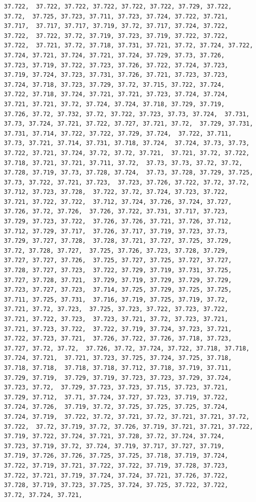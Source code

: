 \documentclass[
]{article}
\begin{document}
\begin{verbatim}
37.722,  37.722, 37.722, 37.722, 37.722, 37.722, 37.729, 37.722, 37.72,  37.725, 37.723, 37.711, 37.723, 37.724, 37.722, 37.721, 37.717,  37.717, 37.717, 37.719, 37.72, 37.717, 37.724, 37.722, 37.722,  37.722, 37.72, 37.719, 37.723, 37.719, 37.722, 37.722, 37.722,  37.721, 37.72, 37.718, 37.731, 37.721, 37.72, 37.724, 37.722,  37.724, 37.721, 37.724, 37.721, 37.724, 37.729, 37.73, 37.726,  37.723, 37.719, 37.722, 37.723, 37.726, 37.722, 37.724, 37.723,  37.719, 37.724, 37.723, 37.731, 37.726, 37.721, 37.723, 37.723,  37.724, 37.718, 37.723, 37.729, 37.72, 37.715, 37.722, 37.724,  37.722, 37.718, 37.724, 37.721, 37.721, 37.723, 37.724, 37.724,  37.721, 37.721, 37.72, 37.724, 37.724, 37.718, 37.729, 37.719,  37.726, 37.72, 37.732, 37.72, 37.722, 37.723, 37.73, 37.724,  37.731, 37.73, 37.724, 37.721, 37.722, 37.727, 37.721, 37.72,  37.729, 37.731, 37.731, 37.714, 37.722, 37.722, 37.729, 37.724,  37.722, 37.711, 37.73, 37.721, 37.714, 37.731, 37.718, 37.724,  37.724, 37.73, 37.73, 37.722, 37.721, 37.724, 37.72, 37.72, 37.721,  37.721, 37.72, 37.722, 37.718, 37.721, 37.721, 37.711, 37.72,  37.73, 37.73, 37.72, 37.72, 37.728, 37.719, 37.73, 37.728, 37.724,  37.73, 37.728, 37.729, 37.725, 37.73, 37.722, 37.721, 37.723,  37.723, 37.726, 37.722, 37.72, 37.72, 37.712, 37.723, 37.728,  37.722, 37.72, 37.724, 37.723, 37.722, 37.721, 37.722, 37.722,  37.712, 37.724, 37.726, 37.724, 37.727, 37.726, 37.72, 37.726,  37.726, 37.722, 37.731, 37.717, 37.723, 37.729, 37.723, 37.722,  37.726, 37.726, 37.721, 37.726, 37.712, 37.712, 37.729, 37.717,  37.726, 37.717, 37.719, 37.723, 37.73, 37.729, 37.727, 37.728,  37.728, 37.721, 37.727, 37.725, 37.729, 37.72, 37.728, 37.727,  37.725, 37.726, 37.723, 37.728, 37.729, 37.727, 37.727, 37.726,  37.725, 37.727, 37.725, 37.727, 37.727, 37.728, 37.727, 37.723,  37.722, 37.729, 37.719, 37.731, 37.725, 37.727, 37.728, 37.721,  37.729, 37.719, 37.729, 37.729, 37.729, 37.723, 37.727, 37.723,  37.714, 37.725, 37.729, 37.725, 37.725, 37.711, 37.725, 37.731,  37.716, 37.719, 37.725, 37.719, 37.72, 37.721, 37.72, 37.723,  37.725, 37.723, 37.722, 37.723, 37.722, 37.721, 37.722, 37.723,  37.723, 37.721, 37.72, 37.723, 37.721, 37.721, 37.723, 37.722,  37.722, 37.719, 37.724, 37.723, 37.721, 37.722, 37.723, 37.721,  37.726, 37.722, 37.726, 37.718, 37.723, 37.727, 37.72, 37.72,  37.726, 37.72, 37.724, 37.722, 37.718, 37.718, 37.724, 37.721,  37.721, 37.723, 37.725, 37.724, 37.725, 37.718, 37.718, 37.718,  37.718, 37.718, 37.712, 37.718, 37.719, 37.711, 37.729, 37.719,  37.729, 37.719, 37.723, 37.723, 37.729, 37.724, 37.723, 37.72,  37.729, 37.723, 37.723, 37.715, 37.723, 37.721, 37.729, 37.712,  37.71, 37.724, 37.727, 37.723, 37.719, 37.722, 37.724, 37.726,  37.719, 37.72, 37.725, 37.725, 37.725, 37.724, 37.724, 37.719,  37.722, 37.72, 37.721, 37.72, 37.721, 37.721, 37.72, 37.722,  37.72, 37.719, 37.72, 37.726, 37.719, 37.721, 37.721, 37.722,  37.719, 37.722, 37.724, 37.721, 37.728, 37.72, 37.724, 37.724,  37.723, 37.719, 37.72, 37.724, 37.719, 37.717, 37.727, 37.719,  37.719, 37.726, 37.726, 37.725, 37.725, 37.718, 37.719, 37.724,  37.722, 37.719, 37.721, 37.722, 37.722, 37.719, 37.728, 37.723,  37.722, 37.721, 37.719, 37.724, 37.724, 37.721, 37.726, 37.722,  37.728, 37.719, 37.723, 37.725, 37.724, 37.725, 37.722, 37.722,  37.72, 37.724, 37.721, 
\end{verbatim}
\end{document}
